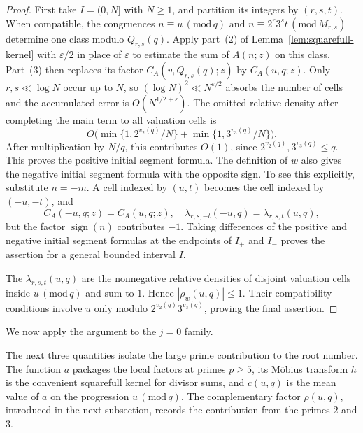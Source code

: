 \documentclass[12pt,reqno]{amsart}
\numberwithin{equation}{section}
\theoremstyle{definition}
\renewcommand{\le}{\leqslant}
\renewcommand{\ge}{\geqslant}
\DeclareMathOperator{\sign}{sign}
\renewcommand{\pmod}[1]{\,(\mathrm{mod}\,#1)}
\begin{document}
\begin{proof}
First take $I=(0,N]$ with $N\ge1$, and partition its integers by $(r,s,t)$.
When compatible, the congruences $n\equiv u\pmod q$ and $n\equiv2^r3^s t\pmod{M_{r,s}}$ determine one class modulo $Q_{r,s}(q)$.
Apply part~(2) of Lemma~\ref{lem:squarefull-kernel} with $\varepsilon/2$ in place of $\varepsilon$ to estimate the sum of $A(n;z)$ on this class.
Part~(3) then replaces its factor $C_A(v,Q_{r,s}(q);z)$ by $C_A(u,q;z)$.
Only $r,s\ll\log N$ occur up to $N$, so $(\log N)^2\ll N^{\varepsilon/2}$ absorbs the number of cells and the accumulated error is $O(N^{1/2+\varepsilon})$.
The omitted relative density after completing the main term to all valuation cells is
\[
O\bigl(\min\{1,2^{v_2(q)}/N\}+
\min\{1,3^{v_3(q)}/N\}\bigr).
\]
After multiplication by $N/q$, this contributes $O(1)$, since $2^{v_2(q)},3^{v_3(q)}\le q$.
This proves the positive initial segment formula.
The definition of $w$ also gives the negative initial segment formula with the opposite sign.
To see this explicitly, substitute $n=-m$.
A cell indexed by $(u,t)$ becomes the cell indexed by $(-u,-t)$, and
\[
C_A(-u,q;z)=C_A(u,q;z),\quad
\lambda_{r,s,-t}(-u,q)=\lambda_{r,s,t}(u,q),
\]
but the factor $\sign(n)$ contributes $-1$.
Taking differences of the positive and negative initial segment formulas at the endpoints of $I_+$ and $I_-$ proves the assertion for a general bounded interval $I$.

The $\lambda_{r,s,t}(u,q)$ are the nonnegative relative densities of disjoint valuation cells inside $u\pmod q$ and sum to $1$.
Hence $|\rho_w(u,q)|\le1$.
Their compatibility conditions involve $u$ only modulo $2^{v_2(q)}3^{v_3(q)}$, proving the final assertion.
\end{proof}

We now apply the argument to the $j=0$ family.

The next three quantities isolate the large prime contribution to the root number.
The function $a$ packages the local factors at primes $p\ge 5$, its M\"obius transform $h$ is the convenient squarefull kernel for divisor sums, and $c(u,q)$ is the mean value of $a$ on the progression $u\pmod q$.
The complementary factor $\rho(u,q)$, introduced in the next subsection, records the contribution from the primes $2$ and $3$.
\end{document}
